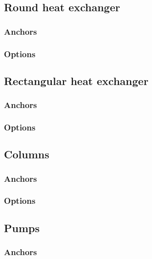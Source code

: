 \documentclass[a4paper, twoside]{article}
\begin{document}
    \subsection{Round heat exchanger}
        \subsubsection{Anchors}
            

        \subsubsection{Options}
            

    \subsection{Rectangular heat exchanger}
        \subsubsection{Anchors}
            

        \subsubsection{Options}
            

    \subsection{Columns}
        \subsubsection{Anchors}
            

        \subsubsection{Options}
            

    \subsection{Pumps}
        \subsubsection{Anchors}
            
\end{document}
